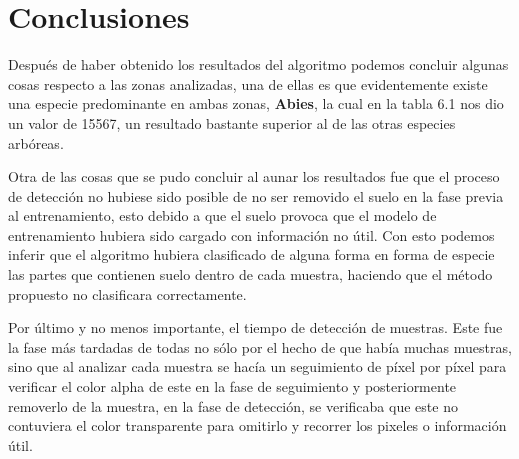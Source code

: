 \chapter{Conclusiones}
Después de haber obtenido los resultados del algoritmo podemos concluir algunas cosas respecto a las zonas analizadas, una de ellas es que evidentemente existe una especie predominante en ambas zonas, \textbf{Abies}, la cual en la tabla 6.1 nos dio un valor de 15567, un resultado bastante superior al de las otras especies arbóreas.

Otra de las cosas que se pudo concluir al aunar los resultados fue que el proceso de detección no hubiese sido posible de no ser removido el suelo en la fase previa al entrenamiento, esto debido a que el suelo provoca que el modelo de entrenamiento hubiera sido cargado con información no útil. Con esto podemos inferir que el algoritmo hubiera clasificado de alguna forma en forma de especie las partes que contienen suelo dentro de cada muestra, haciendo que el método propuesto no clasificara correctamente.

Por último y no menos importante, el tiempo de detección de muestras. Este fue la fase más tardadas de todas no sólo por el hecho de que había muchas muestras, sino que al analizar cada muestra se hacía un seguimiento de píxel por píxel para verificar el color alpha de este en la fase de seguimiento y posteriormente removerlo de la muestra, en la fase de detección, se verificaba que este no contuviera el color transparente para omitirlo y recorrer los pixeles o información útil.
